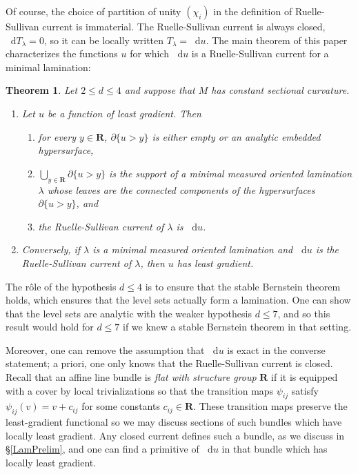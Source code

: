 \documentclass[reqno,11pt]{amsart}
\newcommand{\RR}{\mathbf{R}}
\newcommand*\dif{\mathop{}\!\mathrm{d}}
\newcommand{\dfn}[1]{\emph{#1}\index{#1}}
\newtheorem{mainthm}{Theorem}
\theoremstyle{definition}
\numberwithin{equation}{section}
\begin{document}
Of course, the choice of partition of unity $(\chi_i)$ in the definition of Ruelle-Sullivan current is immaterial.
The Ruelle-Sullivan current is always closed, $\dif T_\lambda = 0$, so it can be locally written $T_\lambda = \dif u$.
The main theorem of this paper characterizes the functions $u$ for which $\dif u$ is a Ruelle-Sullivan current for a minimal lamination:

\begin{mainthm}\label{main thm}
Let $2 \leq d \leq 4$ and suppose that $M$ has constant sectional curvature.
\begin{enumerate}
\item Let $u$ be a function of least gradient.
Then
\begin{enumerate}
\item for every $y \in \RR$, $\partial \{u > y\}$ is either empty or an analytic embedded hypersurface,
\item $\bigcup_{y \in \RR} \partial \{u > y\}$ is the support of a minimal measured oriented lamination $\lambda$ whose leaves are the connected components of the hypersurfaces $\partial \{u > y\}$, and
\item the Ruelle-Sullivan current of $\lambda$ is $\dif u$.
\end{enumerate}
\item Conversely, if $\lambda$ is a minimal measured oriented lamination and $\dif u$ is the Ruelle-Sullivan current of $\lambda$, then $u$ has least gradient.
\end{enumerate}
\end{mainthm}

The r\^ole of the hypothesis $d \leq 4$ is to ensure that the stable Bernstein theorem \cite{Chodosh2021} holds, which ensures that the level sets actually form a lamination.
One can show that the level sets are analytic with the weaker hypothesis $d \leq 7$, and so this result would hold for $d \leq 7$ if we knew a stable Bernstein theorem in that setting.

Moreover, one can remove the assumption that $\dif u$ is exact in the converse statement; a priori, one only knows that the Ruelle-Sullivan current is closed.
Recall that an affine line bundle is \dfn{flat with structure group} $\RR$ if it is equipped with a cover by local trivializations so that the transition maps $\psi_{ij}$ satisfy $\psi_{ij}(v) = v + c_{ij}$ for some constants $c_{ij} \in \RR$.
These transition maps preserve the least-gradient functional so we may discuss sections of such bundles which have locally least gradient.
Any closed current defines such a bundle, as we discuss in \S\ref{LamPrelim}, and one can find a primitive of $\dif u$ in that bundle which has locally least gradient.
\end{document}
